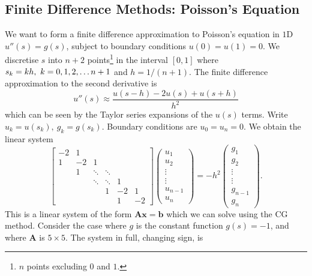 \documentclass{article}
\begin{document}
\subsection{Finite Difference Methods: Poisson's Equation}
We want to form a finite difference approximation to Poisson's equation in $1$D $u''(s)=g(s)$,
subject to boundary conditions $u(0) = u(1) = 0$.
We discretise $s$ into $n+2$ points\footnote{
	$n$ points excluding $0$ and $1$.
} in the interval $[0, 1]$ where $s_k = kh, ~k=0, 1, 2, \mathellipsis n+1$ and $h = 1/(n+1)$.
The finite difference approximation to the second derivative is
\begin{equation}
	u''(s) \approx \dfrac{u(s-h) - 2u(s) + u(s+h)}{h^2} 
\end{equation}
which can be seen by the Taylor series expansions of the $u(s)$ terms.
Write $u_k = u(s_k),~g_k = g(s_k)$. Boundary conditions are $u_0 = u_n = 0$. We obtain the linear system
\begin{equation*}
	\begin{bmatrix}
		-2 & 1 & ~ & ~ & ~ & ~ \\
		1 & -2 & 1 & ~ & ~ & ~ \\
		~ & 1 & \ddots & \ddots & ~ & ~ \\
		~ & ~ & \ddots & \ddots & 1 & ~ \\
		~ & ~ & ~ & 1 & -2 & 1 \\
		~ & ~ & ~ & ~ & 1 & -2 
	\end{bmatrix} \begin{pmatrix}
	u_1 \\
	u_2 \\
	\vdots \\
	\vdots \\
	u_{n-1} \\
	u_{n}
	\end{pmatrix} = -{h^2}\begin{pmatrix}
	g_1 \\
	g_2 \\
	\vdots \\
	\vdots \\
	g_{n-1} \\
	g_n
\end{pmatrix}.
\end{equation*}
This is a linear system of the form $\mathbf{Ax} = \mathbf{b}$ which we can solve using the CG method.
Consider the case where $g$ is the constant function $g(s) = -1$, and where $\mathbf{A}$ is $5 \times 5$.
The system in full, changing sign, is
\end{document}
